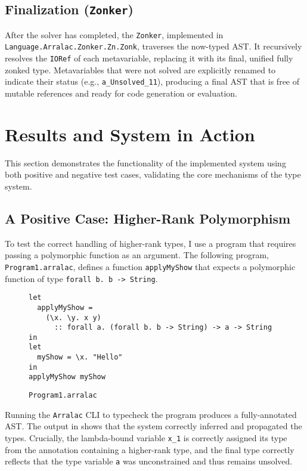\subsection{Finalization (\texttt{Zonker})}
After the solver has completed, the \texttt{Zonker}, implemented in \\ \texttt{Language.Arralac.Zonker.Zn.Zonk}, traverses the now-typed AST. It recursively resolves the \texttt{IORef} of each metavariable, replacing it with its final, unified fully zonked type. Metavariables that were not solved are explicitly renamed to indicate their status (e.g., \texttt{a\_Unsolved\_11}), producing a final AST that is free of mutable references and ready for code generation or evaluation.

\section{Results and System in Action}
\label{sec:Implementation:Results}

This section demonstrates the functionality of the implemented system using both positive and negative test cases, validating the core mechanisms of the type system.

\subsection{A Positive Case: Higher-Rank Polymorphism}
To test the correct handling of higher-rank types, I use a program that requires passing a polymorphic function as an argument. The following program, \texttt{Program1.arralac}, defines a function \texttt{applyMyShow} that expects a polymorphic function of type \texttt{forall b. b -> String}.

\begin{figure}
  \begin{verbatim}
let
  applyMyShow =
    (\x. \y. x y)
      :: forall a. (forall b. b -> String) -> a -> String
in
let
  myShow = \x. "Hello"
in
applyMyShow myShow
\end{verbatim}
\caption{\texttt{Program1.arralac}}
\end{figure}

Running the \texttt{Arralac} CLI to typecheck the program produces a fully-annotated AST. The output in  shows that the system correctly inferred and propagated the types. Crucially, the lambda-bound variable \texttt{x\_1} is correctly assigned its type from the annotation containing a higher-rank type, and the final type correctly reflects that the type variable \texttt{a} was unconstrained and thus remains unsolved.

